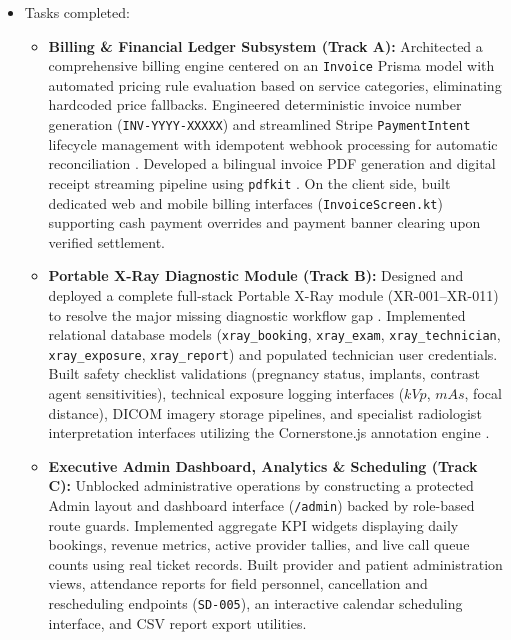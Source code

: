 \documentclass[onecolumn,journal]{IEEEtran}
\begin{document}
	\begin{itemize}
		\item Tasks completed:
		\begin{itemize}
			\item \textbf{Billing \& Financial Ledger Subsystem (Track A):} Architected a comprehensive billing engine centered on an \texttt{Invoice} Prisma model with automated pricing rule evaluation based on service categories, eliminating hardcoded price fallbacks. Engineered deterministic invoice number generation (\texttt{INV-YYYY-XXXXX}) and streamlined Stripe \texttt{PaymentIntent} lifecycle management with idempotent webhook processing for automatic reconciliation \cite{stripe2024api}. Developed a bilingual invoice PDF generation and digital receipt streaming pipeline using \texttt{pdfkit} \cite{srs2026}. On the client side, built dedicated web and mobile billing interfaces (\texttt{InvoiceScreen.kt}) supporting cash payment overrides and payment banner clearing upon verified settlement.
			
			\item \textbf{Portable X-Ray Diagnostic Module (Track B):} Designed and deployed a complete full-stack Portable X-Ray module (XR-001--XR-011) to resolve the major missing diagnostic workflow gap \cite{srs2026}. Implemented relational database models (\texttt{xray\_booking}, \texttt{xray\_exam}, \texttt{xray\_technician}, \texttt{xray\_exposure}, \texttt{xray\_report}) and populated technician user credentials. Built safety checklist validations (pregnancy status, implants, contrast agent sensitivities), technical exposure logging interfaces ($kVp$, $mAs$, focal distance), DICOM imagery storage pipelines, and specialist radiologist interpretation interfaces utilizing the Cornerstone.js annotation engine \cite{dicom2021, pacs2001}.
			
			\item \textbf{Executive Admin Dashboard, Analytics \& Scheduling (Track C):} Unblocked administrative operations by constructing a protected Admin layout and dashboard interface (\texttt{/admin}) backed by role-based route guards. Implemented aggregate KPI widgets displaying daily bookings, revenue metrics, active provider tallies, and live call queue counts using real ticket records. Built provider and patient administration views, attendance reports for field personnel, cancellation and rescheduling endpoints (\texttt{SD-005}), an interactive calendar scheduling interface, and CSV report export utilities.
			

\end{itemize}
\end{itemize}
\end{document}
